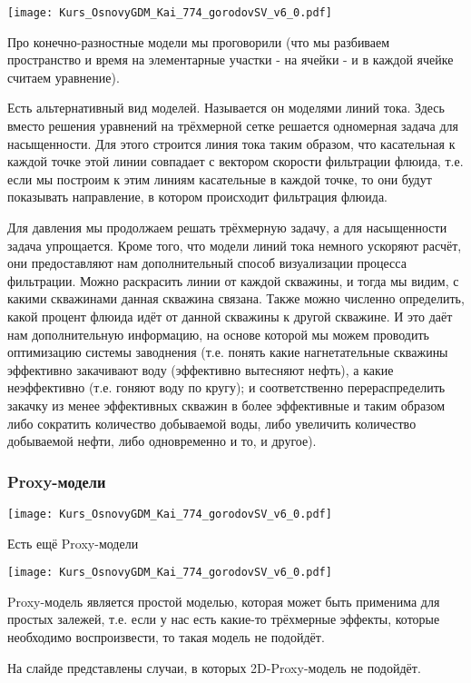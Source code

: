 \documentclass[main.tex]{subfiles}
\begin{document}
\texttt{[image: Kurs\_OsnovyGDM\_Kai\_774\_gorodovSV\_v6\_0.pdf]}

Про конечно-разностные модели мы проговорили (что мы разбиваем пространство и время на элементарные участки - на ячейки - и в каждой ячейке считаем уравнение).

Есть альтернативный вид моделей. Называется он моделями линий тока.
Здесь вместо решения уравнений на трёхмерной сетке решается одномерная задача для насыщенности.
Для этого строится линия тока таким образом, что касательная к каждой точке этой линии совпадает с вектором скорости фильтрации флюида, т.е. если мы построим к этим линиям касательные в каждой точке, то они будут показывать направление, в котором происходит фильтрация флюида.

Для давления мы продолжаем решать трёхмерную задачу, а для насыщенности задача упрощается.
Кроме того, что модели линий тока немного ускоряют расчёт, они предоставляют нам дополнительный способ визуализации процесса фильтрации.
Можно раскрасить линии от каждой скважины, и тогда мы видим, с какими скважинами данная скважина связана.
Также можно численно определить, какой процент флюида идёт от данной скважины к другой скважине.
 И это даёт нам дополнительную информацию, на основе которой мы можем проводить оптимизацию системы заводнения (т.е. понять какие нагнетательные скважины эффективно закачивают воду (эффективно вытесняют нефть), а какие неэффективно (т.е. гоняют воду по кругу); и соответственно перераспределить закачку из менее эффективных скважин в более эффективные и таким образом либо сократить количество добываемой воды, либо увеличить количество добываемой нефти, либо одновременно и то, и другое).

\subsubsection{Proxy-модели}

\texttt{[image: Kurs\_OsnovyGDM\_Kai\_774\_gorodovSV\_v6\_0.pdf]}

Есть ещё Proxy-модели

\texttt{[image: Kurs\_OsnovyGDM\_Kai\_774\_gorodovSV\_v6\_0.pdf]}

Proxy-модель является простой моделью, которая может быть применима для простых залежей, т.е. если у нас есть какие-то трёхмерные эффекты, которые необходимо воспроизвести, то такая модель не подойдёт.

На слайде представлены случаи, в которых 2D-Proxy-модель не подойдёт.
\end{document}
